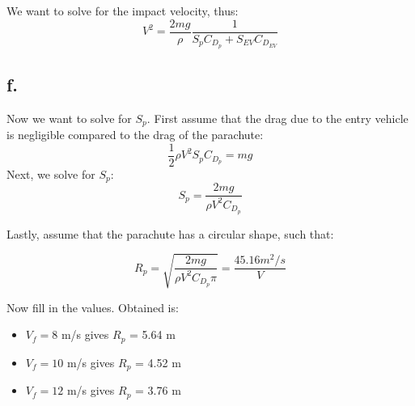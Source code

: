 We want to solve for the impact velocity, thus:
\begin{equation}
    V^2  =\frac{2 mg}{\rho} \frac{1}{S_{p}C_{D_p} + S_{EV}C_{D_{EV}}}
\end{equation}

\subsection*{f.}
Now we want to solve for $S_{p}$. First assume that the drag due to the entry vehicle is negligible compared to the drag of the parachute:
\begin{equation}
    \frac{1}{2}\rho V^2 S_{p}C_{D_p} = mg
\end{equation}
Next, we solve for $S_p$:
\begin{equation}
     S_{p} = \frac{2mg}{\rho V^2 C_{D_p}}
\end{equation}

Lastly, assume that the parachute has a circular shape, such that:

\begin{equation}
     R_p = \sqrt{\frac{2mg}{\rho V^2 C_{D_p} \pi}} = \frac{45.16 m^2/s}{V}
\end{equation}

Now fill in the values. Obtained is:

\begin{itemize}
    \item $V_f = 8$ m/s gives $R_p$ = 5.64 m \\ 
    \item $V_f = 10$ m/s gives $R_p$ = 4.52 m \\ 
    \item $V_f = 12$ m/s gives $R_p$ = 3.76 m \\ 
\end{itemize}
